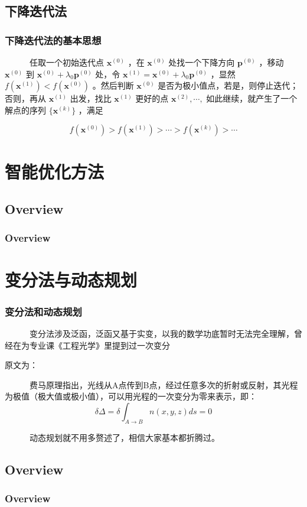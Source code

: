 \documentclass[slidestop,compress,mathserif,c]{beamer}
\begin{document}
\subsection{\hfill 下降迭代法}
\begin{frame}
\frametitle{下降迭代法的基本思想}
~~~~~~任取一个初始迭代点
 $ \mathbf{x}^{(0)} $ ，在
 $ \mathbf{x}^{(0)} $ 处找一个下降方向
 $ \mathbf{p}^{(0)} $ ，移动
 $ \mathbf{x}^{(0)} $ 到
 $ \mathbf{x}^{(0)}+\lambda_0\mathbf{p}^{(0)} $ 处，令
 $ \mathbf{x}^{(1)}=\mathbf{x}^{(0)}+\lambda_0\mathbf{p}^{(0)} $ ，显然
 $ f(\mathbf{x}^{(1)})<f(\mathbf{x}^{(0)}) $ 。然后判断
 $ \mathbf{x}^{(0)} $ 是否为极小值点，若是，则停止迭代；否则，再从
 $ \mathbf{x}^{(1)} $ 出发，找比
 $ \mathbf{x}^{(1)} $ 更好的点
 $ \mathbf{x}^{(2)},\cdots, $ 如此继续，就产生了一个解点的序列
 $ \{\mathbf{x}^{(k)}\} $ ，满足

 $$ f(\mathbf{x}^{(0)})>f(\mathbf{x}^{(1)})>\cdots>f(\mathbf{x}^{(k)})>\cdots $$ 

\end{frame}

\section{智能优化方法}

\subsection{\hfill Overview}
\begin{frame}
\frametitle{Overview}


\end{frame}



\section{变分法与动态规划}

\begin{frame}
\frametitle{变分法和动态规划}
~~~~~~变分法涉及泛函，泛函又基于实变，以我的数学功底暂时无法完全理解，曾经在为专业课《工程光学》里提到过一次变分

原文为：

~~~~~~费马原理指出，光线从A点传到B点，经过任意多次的折射或反射，其光程为极值（极大值或极小值），可以用光程的一次变分为零来表示，即：
 $$ \delta\Delta=\delta\int_{A\to B}n(x,y,z)ds=0 $$ 

~~~~~~动态规划就不用多赘述了，相信大家基本都折腾过。

\end{frame}




\subsection{\hfill Overview}
\begin{frame}
\frametitle{Overview}


\end{frame}
\end{document}

